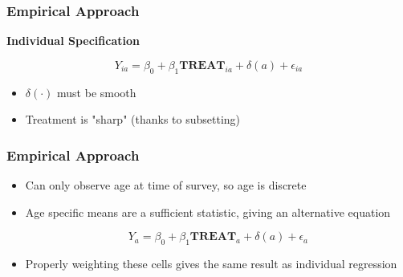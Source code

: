 \documentclass{beamer}
\begin{document}

\begin{frame}
\frametitle{Empirical Approach}

\begin{center}
   \textbf{Individual Specification} 
\end{center}
$$ Y_{ia} = \beta_0 + \beta_1 \textbf{TREAT}_{ia} + \delta(a) + \epsilon_{ia}$$

\begin{itemize}
\item $\delta(\cdot)$ must be smooth
\item Treatment is "sharp" (thanks to subsetting)
\end{itemize}

\begin{center}
\end{center}

\end{frame}


\begin{frame}
\frametitle{Empirical Approach}

\begin{itemize}
	\setlength{\itemsep}{6mm}
\item Can only observe age at time of survey, so age is discrete 
\item Age specific means are a sufficient statistic, giving an alternative equation 

$$ Y_{a} = \beta_0 + \beta_1 \textbf{TREAT}_{a} + \delta(a) + \epsilon_{a}$$

\item Properly weighting these cells gives the same result as individual regression


\end{itemize}

\end{frame}
\end{document}
